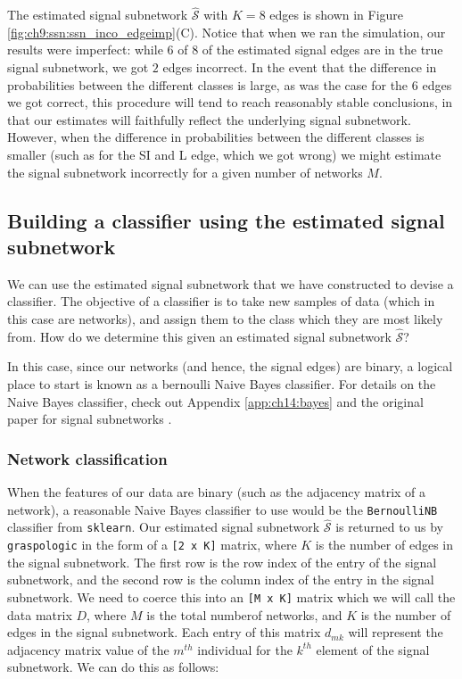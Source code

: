 The estimated signal subnetwork $\hat{\mathcal S}$ with $K=8$ edges is shown in Figure \ref{fig:ch9:ssn:ssn_inco_edgeimp}(C). Notice that when we ran the simulation, our results were imperfect: while $6$ of $8$ of the estimated signal edges are in the true signal subnetwork, we got $2$ edges incorrect. In the event that the difference in probabilities between the different classes is large, as was the case for the $6$ edges we got correct, this procedure will tend to reach reasonably stable conclusions, in that our estimates will faithfully reflect the underlying signal subnetwork. However, when the difference in probabilities between the different classes is smaller (such as for the SI and L edge, which we got wrong) we might estimate the signal subnetwork incorrectly for a given number of networks $M$.

\subsection{Building a classifier using the estimated signal subnetwork}

We can use the estimated signal subnetwork that we have constructed to devise a classifier. The objective of a classifier is to take new samples of data (which in this case are networks), and assign them to the class which they are most likely from. How do we determine this given an estimated signal subnetwork $\hat{\mathcal S}$?

In this case, since our networks (and hence, the signal edges) are binary, a logical place to start is known as a bernoulli Naive Bayes classifier. For details on the Naive Bayes classifier, check out Appendix \ref{app:ch14:bayes} and the original paper for signal subnetworks \cite{Vogelstein2013Jul}.

\subsubsection*{Network classification}

When the features of our data are binary (such as the adjacency matrix of a network), a reasonable Naive Bayes classifier to use would be the \texttt{BernoulliNB} classifier from \texttt{sklearn}. Our estimated signal subnetwork $\hat{\mathcal S}$ is returned to us by \texttt{graspologic} in the form of a \texttt{[2 x K]} matrix, where $K$ is the number of edges in the signal subnetwork. The first row is the row index of the entry of the signal subnetwork, and the second row is the column index of the entry in the signal subnetwork. We need to coerce this into an \texttt{[M x K]} matrix which we will call the data matrix $D$, where $M$ is the total numberof networks, and $K$ is the number of edges in the signal subnetwork. Each entry of this matrix $d_{mk}$ will represent the adjacency matrix value of the $m^{th}$ individual for the $k^{th}$ element of the signal subnetwork. We can do this as follows:

